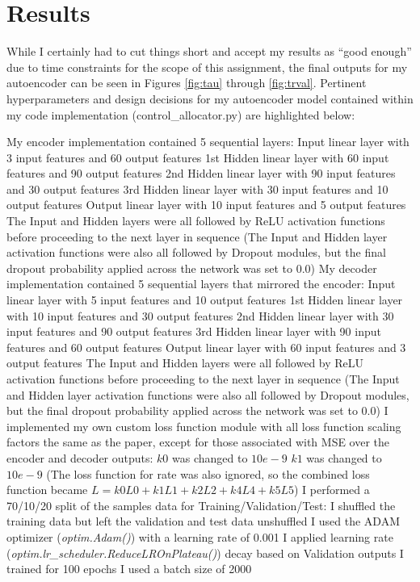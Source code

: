 \documentclass{article}
\begin{document}
\section{Results}
While I certainly had to cut things short and accept my results as ``good enough'' due to time constraints for the scope of this assignment, the final outputs for my autoencoder can be seen in Figures \ref{fig:tau} through \ref{fig:trval}. Pertinent hyperparameters and design decisions for my autoencoder model contained within my code implementation (control\_allocator.py) are highlighted below:
\begin{outline}
    \1 My encoder implementation contained 5 sequential layers:
        \2 Input linear layer with 3 input features and 60 output features
        \2 1st Hidden linear layer with 60 input features and 90 output features
        \2 2nd Hidden linear layer with 90 input features and 30 output features
        \2 3rd Hidden linear layer with 30 input features and 10 output features
        \2 Output linear layer with 10 input features and 5 output features
        \2 The Input and Hidden layers were all followed by ReLU activation functions before proceeding to the next layer in sequence
        \2 (The Input and Hidden layer activation functions were also all followed by Dropout modules, but the final dropout probability applied across the network was set to 0.0)
    \1 My decoder implementation contained 5 sequential layers that mirrored the encoder:
        \2 Input linear layer with 5 input features and 10 output features
        \2 1st Hidden linear layer with 10 input features and 30 output features
        \2 2nd Hidden linear layer with 30 input features and 90 output features
        \2 3rd Hidden linear layer with 90 input features and 60 output features
        \2 Output linear layer with 60 input features and 3 output features
        \2 The Input and Hidden layers were all followed by ReLU activation functions before proceeding to the next layer in sequence
        \2 (The Input and Hidden layer activation functions were also all followed by Dropout modules, but the final dropout probability applied across the network was set to 0.0)
    \1 I implemented my own custom loss function module with all loss function scaling factors the same as the paper, except for those associated with MSE over the encoder and decoder outputs:
        \2 $k0$ was changed to $10e-9$
        \2 $k1$ was changed to $10e-9$
        \2 (The loss function for rate was also ignored, so the combined loss function became $L = k0L0 + k1L1 + k2L2 + k4L4 + k5L5$)
    \1 I performed a 70/10/20 split of the samples data for Training/Validation/Test:
        \2 I shuffled the training data but left the validation and test data unshuffled
    \1 I used the ADAM optimizer (\textit{optim.Adam()}) with a learning rate of 0.001
    \1 I applied learning rate (\textit{optim.lr\_scheduler.ReduceLROnPlateau()}) decay based on Validation outputs
    \1 I trained for 100 epochs
    \1 I used a batch size of 2000
\end{outline}
\end{document}
